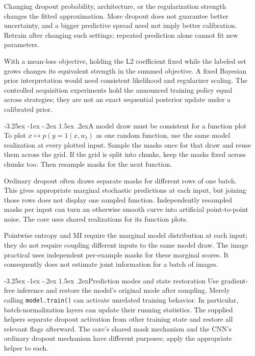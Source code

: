 \documentclass[11pt,a4paper]{article}
\makeatletter
\renewcommand\subsection{\@startsection{subsection}{2}{\z@}%
  {-3.25ex \@plus -1ex \@minus -.2ex}%
  {1.5ex \@plus .2ex}{\normalfont\large}}
\makeatother
\begin{document}
Changing dropout probability, architecture, or the regularization strength
changes the fitted approximation. More dropout does not guarantee better
uncertainty, and a bigger predictive spread need not imply better calibration.
Retrain after changing such settings; repeated prediction alone cannot fit
new parameters.

With a mean-loss objective, holding the L2 coefficient fixed while the labeled
set grows changes its equivalent strength in the summed objective. A fixed
Bayesian prior interpretation would need consistent likelihood and regularizer
scaling. The controlled acquisition experiments hold the announced training
policy equal across strategies; they are not an exact sequential posterior
update under a calibrated prior.

\subsection{A model draw must be consistent for a function plot}
To plot $x\mapsto p(y=1\mid x,w_t)$ as one random function, use the same
model realization at every plotted input. Sample the masks once for that
draw and reuse them across the grid. If the grid is split into chunks, keep
the masks fixed across chunks too. Then resample masks for the next function.

Ordinary dropout often draws separate masks for different rows of one batch.
This gives appropriate marginal stochastic predictions at each input, but
joining those rows does not display one sampled function. Independently
resampled masks per input can turn an otherwise smooth curve into artificial
point-to-point noise. The core uses shared realizations for its function plots.

Pointwise entropy and MI require the marginal model distribution at each
input; they do not require coupling different inputs to the same model draw.
The image practical uses independent per-example masks for these marginal
scores. It consequently does not estimate joint information for a batch of
images.

\subsection{Prediction modes and state restoration}
Use gradient-free inference and restore the model's original mode after
sampling. Merely calling \texttt{model.train()} can activate unrelated training
behavior. In particular, batch-normalization layers can update their running
statistics. The supplied helpers separate dropout activation from other
training state and restore all relevant flags afterward. The core's shared
mask mechanism and the CNN's ordinary dropout mechanism have different
purposes; apply the appropriate helper to each.
\end{document}
